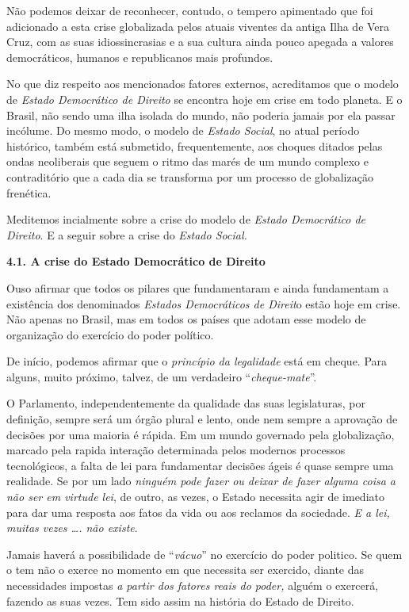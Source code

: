 Não podemos deixar de reconhecer, contudo, o tempero apimentado que foi
adicionado a esta crise globalizada pelos atuais viventes da antiga Ilha
de Vera Cruz, com as suas idiossincrasias e a sua cultura ainda pouco
apegada a valores democráticos, humanos e republicanos mais profundos.

No que diz respeito aos mencionados fatores externos, acreditamos que o
modelo de \emph{Estado Democrático de Direito} se encontra hoje em crise
em todo planeta. E o Brasil, não sendo uma ilha isolada do mundo, não
poderia jamais por ela passar incólume. Do mesmo modo, o modelo de
\emph{Estado Social}, no atual período histórico, também está submetido,
frequentemente, aos choques ditados pelas ondas neoliberais que seguem o
ritmo das marés de um mundo complexo e contraditório que a cada dia se
transforma por um processo de globalização frenética.

Meditemos incialmente sobre a crise do modelo de \emph{Estado
Democrático de Direito}. E a seguir sobre a crise do \emph{Estado
Social.}

\textbf{4.1. A crise do Estado Democrático de Direito }

Ouso afirmar que todos os pilares que fundamentaram e ainda fundamentam
a existência dos denominados \emph{Estados Democráticos de Direit}o
estão hoje em crise. Não apenas no Brasil, mas em todos os países que
adotam esse modelo de organização do exercício do poder político.

De início, podemos afirmar que o \emph{princípio da legalidade} está em
cheque. Para alguns, muito próximo, talvez, de um verdadeiro
``\emph{cheque-mate}''.

O Parlamento, independentemente da qualidade das suas legislaturas, por
definição, sempre será um órgão plural e lento, onde nem sempre a
aprovação de decisões por uma maioria é rápida. Em um mundo governado
pela globalização, marcado pela rapida interação determinada pelos
modernos processos tecnológicos, a falta de lei para fundamentar
decisões ágeis é quase sempre uma realidade. Se por um lado
\emph{ninguém pode fazer ou deixar de fazer alguma coisa a não ser em
virtude lei}, de outro, as vezes, o Estado necessita agir de imediato
para dar uma resposta aos fatos da vida ou aos reclamos da sociedade.
\emph{E a lei, muitas vezes \ldots{}. não existe}.

Jamais haverá a possibilidade de ``\emph{vácuo}'' no exercício do poder
politico. Se quem o tem não o exerce no momento em que necessita ser
exercido, diante das necessidades impostas \emph{a partir dos fatores
reais do poder,} alguém o exercerá, fazendo as suas vezes. Tem sido
assim na história do Estado de Direito.

